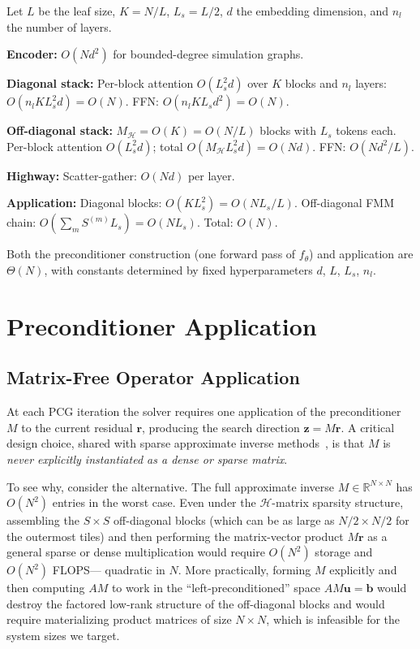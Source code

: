 \documentclass[acmtog,anonymous,review]{acmart}
\begin{document}
Let $L$ be the leaf size, $K = N/L$, $L_s = L/2$, $d$ the embedding dimension, and $n_l$ the
number of layers.

\textbf{Encoder:} $O(N d^2)$ for bounded-degree simulation graphs.

\textbf{Diagonal stack:} Per-block attention $O(L_s^2 d)$ over $K$ blocks and $n_l$ layers:
$O(n_l K L_s^2 d) = O(N)$.  FFN: $O(n_l K L_s d^2) = O(N)$.

\textbf{Off-diagonal stack:} $M_\mathcal{H} = O(K) = O(N/L)$ blocks with $L_s$ tokens each.
Per-block attention $O(L_s^2 d)$; total $O(M_\mathcal{H} L_s^2 d) = O(N d)$.  FFN: $O(N d^2/L)$.

\textbf{Highway:} Scatter-gather: $O(N d)$ per layer.

\textbf{Application:} Diagonal blocks: $O(K L_s^2) = O(N L_s/L)$.  Off-diagonal FMM chain:
$O(\sum_m S^{(m)} L_s) = O(N L_s)$.  Total: $O(N)$.

Both the preconditioner construction (one forward pass of $f_\theta$) and application are
$\Theta(N)$, with constants determined by fixed hyperparameters $d$, $L$, $L_s$, $n_l$.

\section{Preconditioner Application}
\label{sec:application}

\subsection{Matrix-Free Operator Application}
\label{sec:application:matrixfree}

At each PCG iteration the solver requires one application of the preconditioner $M$ to the
current residual $\mathbf{r}$, producing the search direction $\mathbf{z} = M\mathbf{r}$.
A critical design choice, shared with sparse approximate inverse
methods~\cite{yang2025sparse,kolotilina1993factorized}, is that $M$ is \emph{never explicitly
instantiated as a dense or sparse matrix}.

To see why, consider the alternative.  The full approximate inverse $M \in \mathbb{R}^{N \times
N}$ has $O(N^2)$ entries in the worst case.  Even under the $\mathcal{H}$-matrix sparsity
structure, assembling the $S \times S$ off-diagonal blocks (which can be as large as $N/2 \times
N/2$ for the outermost tiles) and then performing the matrix-vector product $M\mathbf{r}$ as a
general sparse or dense multiplication would require $O(N^2)$ storage and $O(N^2)$ FLOPS---
quadratic in $N$.  More practically, forming $M$ explicitly and then computing $AM$ to work in
the ``left-preconditioned'' space $AM\mathbf{u} = \mathbf{b}$ would destroy the factored low-rank
structure of the off-diagonal blocks and would require materializing product matrices of size
$N \times N$, which is infeasible for the system sizes we target.
\end{document}

